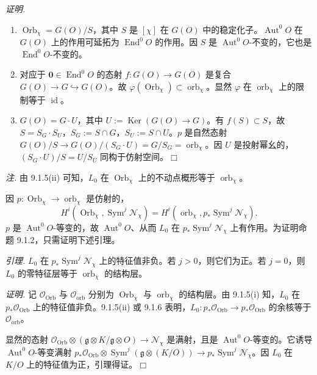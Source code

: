 \emph{证明.}
\begin{enumerate}[label=\roman*),leftmargin=2.2em]
\item $\operatorname{Orb}_{\chi}=G(O)/S$，其中 $S$ 是 $[\chi]$ 在 $G(O)$ 中的稳定化子。$\operatorname{Aut}^{0}O$ 在 $G(O)$ 上的作用可延拓为 $\operatorname{End}^{0}O$ 的作用。因 $S$ 是 $\operatorname{Aut}^{0}O$-不变的，它也是 $\operatorname{End}^{0}O$-不变的。
\item 对应于 $\mathbf{0}\in\operatorname{End}^{0}O$ 的态射 $f:G(O)\to G(O)$ 是复合 $G(O)\to G\hookrightarrow G(O)$。故 $\varphi(\operatorname{Orb}_{\chi})\subset\operatorname{orb}_{\chi}$。显然 $\varphi$ 在 $\operatorname{orb}_{\chi}$ 上的限制等于 $\operatorname{id}$。
\item $G(O)=G\cdot U$，其中 $U:=\operatorname{Ker}(G(O)\to G)$。有 $f(S)\subset S$，故 $S=S_{G}\cdot S_{U}$，$S_{G}:=S\cap G$，$S_{U}:=S\cap U$。$p$ 是自然态射 $G(O)/S\to G(O)/(S_{G}\cdot U)=G/S_{G}=\operatorname{orb}_{\chi}$。因 $U$ 是投射幂幺的，$(S_{G}\cdot U)/S=U/S_{U}$ 同构于仿射空间。\hfill$\Box$
\end{enumerate}

 \emph{注.} 由 9.1.5(ii) 可知，$L_0$ 在 $\operatorname{Orb}_{\chi}$ 上的不动点概形等于 $\operatorname{orb}_{\chi}$。


 因 $p:\operatorname{Orb}_{\chi}\to\operatorname{orb}_{\chi}$ 是仿射的，
\[
H^{i}(\operatorname{Orb}_{\chi},\operatorname{Sym}^{j}\mathcal{N}_{\chi})=H^{i}(\operatorname{orb}_{\chi},p_{*}\operatorname{Sym}^{j}\mathcal{N}_{\chi}).
\]
$p$ 是 $\operatorname{Aut}^{0}O$-等变的，故 $\operatorname{Aut}^{0}O$、从而 $L_0$ 在 $p_{*}\operatorname{Sym}^{j}\mathcal{N}_{\chi}$ 上有作用。为证明命题 9.1.2，只需证明下述引理。

 \emph{引理.} $L_0$ 在 $p_{*}\operatorname{Sym}^{j}\mathcal{N}_{\chi}$ 上的特征值非负。若 $j>0$，则它们为正。若 $j=0$，则 $L_0$ 的零特征层等于 $\operatorname{orb}_{\chi}$ 的结构层。

\emph{证明.} 记 $\mathcal{O}_{\operatorname{Orb}}$ 与 $\mathcal{O}_{\operatorname{orb}}$ 分别为 $\operatorname{Orb}_{\chi}$ 与 $\operatorname{orb}_{\chi}$ 的结构层。由 9.1.5(i) 知，$L_0$ 在 $p_{*}\mathcal{O}_{\operatorname{Orb}}$ 上的特征值非负。9.1.5(ii) 或 9.1.6 表明，$L_0:p_{*}\mathcal{O}_{\operatorname{Orb}}\to p_{*}\mathcal{O}_{\operatorname{Orb}}$ 的余核等于 $\mathcal{O}_{\operatorname{orb}}$。

显然的态射 $\mathcal{O}_{\operatorname{Orb}}\otimes(\mathfrak{g}\otimes K/\mathfrak{g}\otimes O)\to\mathcal{N}_{\chi}$ 是满射，且是 $\operatorname{Aut}^{0}O$-等变的。它诱导 $\operatorname{Aut}^{0}O$-等变满射 $p_{*}\mathcal{O}_{\operatorname{Orb}}\otimes\operatorname{Sym}^{j}(\mathfrak{g}\otimes(K/O))\to p_{*}\operatorname{Sym}^{j}\mathcal{N}_{\chi}$。因 $L_0$ 在 $K/O$ 上的特征值为正，引理得证。\hfill$\Box$

